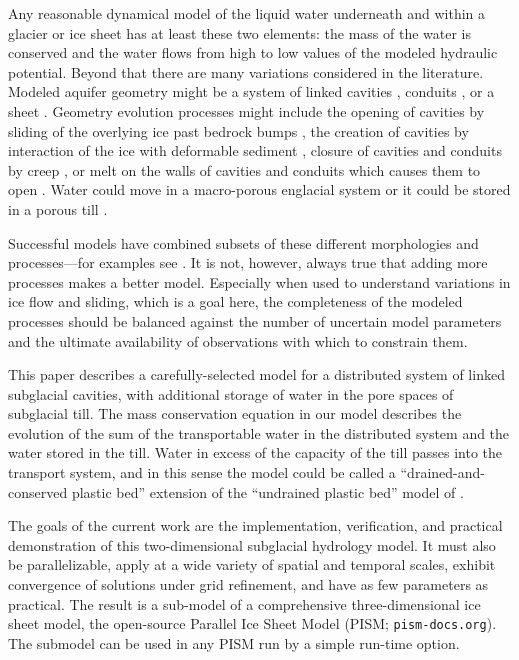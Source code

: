 \documentclass[gmd]{copernicus}   %
\begin{document}
\introduction

Any reasonable dynamical model of the liquid water underneath and within a glacier or ice sheet has at least these two elements: the mass of the water is conserved and the water flows from high to low values of the modeled hydraulic potential.  Beyond that there are many variations considered in the literature.  Modeled aquifer geometry might be a system of linked cavities \citep{Kamb1987}, conduits \citep{Nye1976}, or a sheet \citep{CreytsSchoof2009}.  Geometry evolution processes might include the opening of cavities by sliding of the overlying ice past bedrock bumps \citep{Schoof2005cavitation}, the creation of cavities by interaction of the ice with deformable sediment \citep{Schoof2007deformable}, closure of cavities and conduits by creep \citep{Hewitt2011}, or melt on the walls of cavities and conduits which causes them to open \citep{Clarke05}.  Water could move in a macro-porous englacial system \citep{Bartholomausetal2011,Harperetal2010} or it could be stored in a porous till \citep{Tulaczyketal2000}.

Successful models have combined subsets of these different morphologies and processes---for examples see \cite{FlowersClarke2002_theory,Hewitt2013,vanderWeletal2013,Werderetal2013,deFleurianetal2014}.  It is not, however, always true that adding more processes makes a better model.  Especially when used to understand variations in ice flow and sliding, which is a goal here, the completeness of the modeled processes should be balanced against the number of uncertain model parameters and the ultimate availability of observations with which to constrain them.

This paper describes a carefully-selected model for a distributed system of linked subglacial cavities, with additional storage of water in the pore spaces of subglacial till.  The mass conservation equation in our model describes the evolution of the sum of the transportable water in the distributed system and the water stored in the till.  Water in excess of the capacity of the till passes into the transport system, and in this sense the model could be called a ``drained-and-conserved plastic bed'' extension of the ``undrained plastic bed'' model of \cite{Tulaczyketal2000b}.

The goals of the current work are the implementation, verification, and practical demonstration of this two-dimensional subglacial hydrology model.  It must also be parallelizable, apply at a wide variety of spatial and temporal scales, exhibit convergence of solutions under grid refinement, and have as few parameters as practical.  The result is a sub-model of a comprehensive three-dimensional ice sheet model, the open-source Parallel Ice Sheet Model (PISM; \texttt{pism-docs.org}).  The submodel can be used in any PISM run by a simple run-time option.
\end{document}
